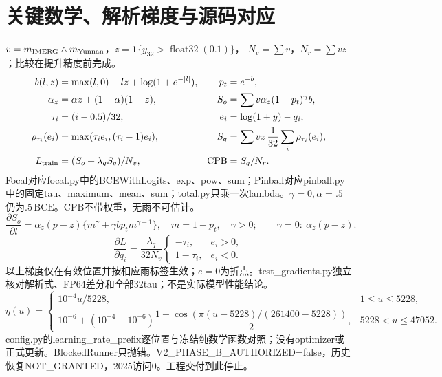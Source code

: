 \documentclass[UTF8,fontset=fandol,10pt]{ctexart}
\begin{document}
\clearpage\section{关键数学、解析梯度与源码对应}
\(v=m_{\rm IMERG}\land m_{\rm Yunnan}\)，\(z=\mathbf1\{y_{32}>\operatorname{float32}(0.1)\}\)，
\(N_v=\sum v\)，\(N_r=\sum vz\)；比较在提升精度前完成。
\begin{align*}
b(l,z)&=\max(l,0)-lz+\log(1+e^{-|l|}),&p_t&=e^{-b},\\
\alpha_z&=\alpha z+(1-\alpha)(1-z),&S_o&=\sum v\alpha_z(1-p_t)^\gamma b,\\
\tau_i&=(i-0.5)/32,&e_i&=\log(1+y)-q_i,\\
\rho_{\tau_i}(e_i)&=\max(\tau_i e_i,(\tau_i-1)e_i),&S_q&=\sum vz\,\frac1{32}\sum_i\rho_{\tau_i}(e_i),\\
L_{\rm train}&=(S_o+\lambda_q S_q)/N_v,&\operatorname{CPB}&=S_q/N_r.
\end{align*}
Focal对应focal.py中的BCEWithLogits、exp、pow、sum；Pinball对应pinball.py中的固定tau、maximum、mean、sum；total.py只乘一次lambda。\(\gamma=0,\alpha=.5\)仍为\(.5\,\mathrm{BCE}\)。CPB不带权重，无雨不可估计。
\[
\frac{\partial S_o}{\partial l}=\alpha_z(p-z)\{m^\gamma+\gamma b p_t m^{\gamma-1}\},\quad m=1-p_t,\quad\gamma>0;
\qquad\gamma=0:\ \alpha_z(p-z).
\]
\[
\frac{\partial L}{\partial q_i}=\frac{\lambda_q}{32N_v}\begin{cases}-\tau_i,&e_i>0,\\1-\tau_i,&e_i<0.\end{cases}
\]
以上梯度仅在有效位置并按相应雨标签生效；\(e=0\)为折点。test\_gradients.py独立核对解析式、FP64差分和全部32tau；不是实际模型性能结论。
\[
\eta(u)=\begin{cases}10^{-4}u/5228,&1\le u\le5228,\\
10^{-6}+(10^{-4}-10^{-6})\dfrac{1+\cos(\pi(u-5228)/(261400-5228))}{2},&5228<u\le47052.\end{cases}
\]
config.py的learning\_rate\_prefix逐位置与冻结纯数学函数对照；没有optimizer或正式更新。BlockedRunner只抛错。V2\_PHASE\_B\_AUTHORIZED=false，历史恢复NOT\_GRANTED，2025访问0。工程交付到此停止。
\end{document}

